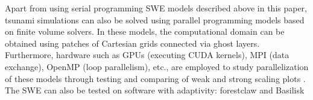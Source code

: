 \documentclass[9pt,a4paper]{article}
\begin{document}
	Apart from using serial programming SWE models described above in this paper, tsunami simulations can also be solved using parallel programming models based on finite volume solvers.  In these models, the computational domain can be obtained using patches of Cartesian grids connected via ghost layers.  Furthermore, hardware such as GPUs (executing CUDA kernels), MPI (data exchange), OpenMP (loop parallelism), etc., are employed to study parallelization of these models through testing and comparing of weak and strong scaling plots \citep{qi-le-mo:2018}.  The SWE can also be tested on software with adaptivity: forestclaw \citep{ca-bu:2017} and  Basilisk \citep{po:2015}
	
	
	
	
	
	
	
	
	
\end{document}
